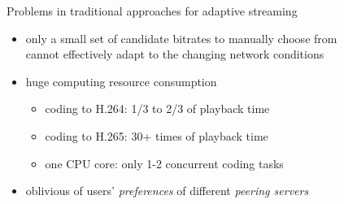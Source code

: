 \documentclass{beamer}
\begin{document}
\begin{frame}{Problems in traditional approaches for adaptive streaming} 
\begin{itemize}
	\item<1> only a small set of candidate bitrates to manually choose from\\ %
	cannot effectively adapt to the changing network conditions
	\item<1> huge computing resource consumption
	\begin{itemize}
		\item<1> coding to H.264: 1/3 to 2/3 of playback time
		\item<1> coding to H.265: 30+ times of playback time
		\item<1> one CPU core: only 1-2 concurrent coding tasks
	\end{itemize}
	\item<1> oblivious of users' \emph{preferences} of different \emph{peering servers}
\end{itemize}
\end{frame}
\end{document}

